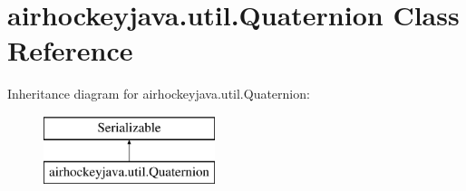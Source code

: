 \hypertarget{classairhockeyjava_1_1util_1_1_quaternion}{}\section{airhockeyjava.\+util.\+Quaternion Class Reference}
\label{classairhockeyjava_1_1util_1_1_quaternion}
Inheritance diagram for airhockeyjava.\+util.\+Quaternion\+:\begin{figure}[H]
\begin{center}
\leavevmode
\includegraphics[height=2.000000cm]{classairhockeyjava_1_1util_1_1_quaternion}
\end{center}
\end{figure}
